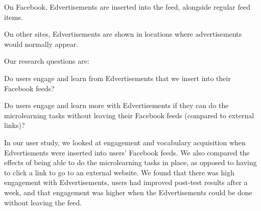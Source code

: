 \documentclass{sigchi}
\begin{document}
\begin{compactitem}
\item On Facebook, Edvertisements are inserted into the feed, alongside regular feed items.
\item On other sites, Edvertisements are shown in locations where advertisements would normally appear.
\end{compactitem}

\pagebreak

Our research questions are:

\begin{compactitem}
\item Do users engage and learn from Edvertisements that we insert into their Facebook feeds?
\item Do users engage and learn more with Edvertisements if they can do the microlearning tasks without leaving their Facebook feeds (compared to external links)?
\end{compactitem}

In our user study, we looked at engagement and vocabulary acquisition when Edvertisments were inserted into users' Facebook feeds. We also compared the effects of being able to do the microlearning tasks in place, as opposed to having to click a link to go to an external website. We found that there was high engagement with Edvertisements, users had improved post-test results after a week, and that engagement was higher when the Edvertisements could be done without leaving the feed. %
\end{document}
